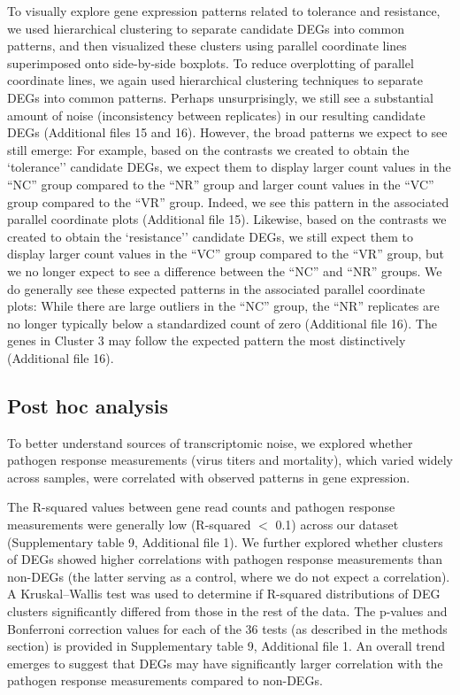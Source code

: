 \documentclass{bmcart}
\begin{document}
\begin{linenumbers}
\begin{doublespacing}
To visually explore gene expression patterns related to tolerance and resistance, we used hierarchical clustering to separate candidate DEGs into common patterns, and then visualized these clusters using parallel coordinate lines superimposed onto side-by-side boxplots. To reduce overplotting of parallel coordinate lines, we again used hierarchical clustering techniques to separate DEGs into common patterns. Perhaps unsurprisingly, we still see a substantial amount of noise (inconsistency between replicates) in our resulting candidate DEGs (Additional files 15 and 16). However, the broad patterns we expect to see still emerge: For example, based on the contrasts we created to obtain the `tolerance'' candidate DEGs, we expect them to display larger count values in the ``NC'' group compared to the ``NR'' group and larger count values in the ``VC'' group compared to the ``VR'' group. Indeed, we see this pattern in the associated parallel coordinate plots (Additional file 15). Likewise, based on the contrasts we created to obtain the `resistance'' candidate DEGs, we still expect them to display larger count values in the ``VC'' group compared to the ``VR'' group, but we no longer expect to see a difference between the ``NC'' and ``NR'' groups. We do generally see these expected patterns in the associated parallel coordinate plots: While there are large outliers in the ``NC'' group, the ``NR'' replicates are no longer typically below a standardized count of zero (Additional file 16). The genes in Cluster 3 may follow the expected pattern the most distinctively (Additional file 16).

\subsection*{Post hoc analysis}

To better understand sources of transcriptomic noise, we explored whether pathogen response measurements (virus titers and mortality), which varied widely across samples, were correlated with observed patterns in gene expression. 

The R-squared values between gene read counts and pathogen response measurements were generally low (R-squared $<$ 0.1) across our dataset (Supplementary table 9, Additional file 1). We further explored whether clusters of DEGs showed higher correlations with pathogen response measurements than non-DEGs (the latter serving as a control, where we do not expect a correlation). A Kruskal–Wallis test was used to determine if R-squared distributions of DEG clusters significantly differed from those in the rest of the data. The p-values and Bonferroni correction values for each of the 36 tests (as described in the methods section) is provided in Supplementary table 9, Additional file 1. An overall trend emerges to suggest that DEGs may have significantly larger correlation with the pathogen response measurements compared to non-DEGs.


\end{doublespacing}
\end{linenumbers}
\end{document}
